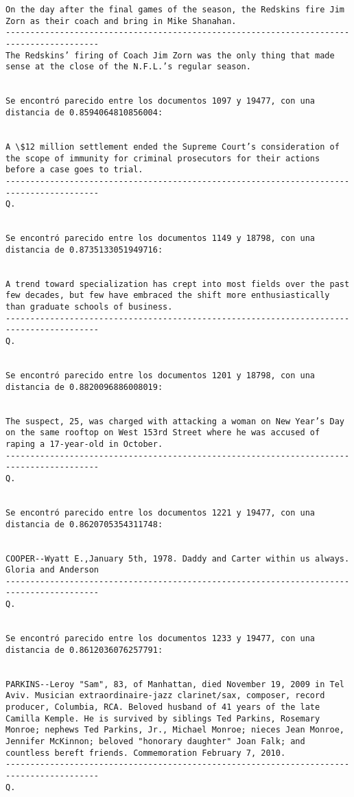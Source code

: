 \documentclass[11pt]{article}
\begin{document}
\begin{Verbatim}[commandchars=\\\{\}]
On the day after the final games of the season, the Redskins fire Jim Zorn as their coach and bring in Mike Shanahan.
-----------------------------------------------------------------------------------------
The Redskins’ firing of Coach Jim Zorn was the only thing that made sense at the close of the N.F.L.’s regular season.


Se encontró parecido entre los documentos 1097 y 19477, con una distancia de 0.8594064810856004:


A \$12 million settlement ended the Supreme Court’s consideration of the scope of immunity for criminal prosecutors for their actions before a case goes to trial.
-----------------------------------------------------------------------------------------
Q.


Se encontró parecido entre los documentos 1149 y 18798, con una distancia de 0.8735133051949716:


A trend toward specialization has crept into most fields over the past few decades, but few have embraced the shift more enthusiastically than graduate schools of business.
-----------------------------------------------------------------------------------------
Q.


Se encontró parecido entre los documentos 1201 y 18798, con una distancia de 0.8820096886008019:


The suspect, 25, was charged with attacking a woman on New Year’s Day on the same rooftop on West 153rd Street where he was accused of raping a 17-year-old in October.
-----------------------------------------------------------------------------------------
Q.


Se encontró parecido entre los documentos 1221 y 19477, con una distancia de 0.8620705354311748:


COOPER--Wyatt E.,January 5th, 1978. Daddy and Carter within us always. Gloria and Anderson
-----------------------------------------------------------------------------------------
Q.


Se encontró parecido entre los documentos 1233 y 19477, con una distancia de 0.8612036076257791:


PARKINS--Leroy "Sam", 83, of Manhattan, died November 19, 2009 in Tel Aviv. Musician extraordinaire-jazz clarinet/sax, composer, record producer, Columbia, RCA. Beloved husband of 41 years of the late Camilla Kemple. He is survived by siblings Ted Parkins, Rosemary Monroe; nephews Ted Parkins, Jr., Michael Monroe; nieces Jean Monroe, Jennifer McKinnon; beloved "honorary daughter" Joan Falk; and countless bereft friends. Commemoration February 7, 2010.
-----------------------------------------------------------------------------------------
Q.



\end{Verbatim}
\end{document}
